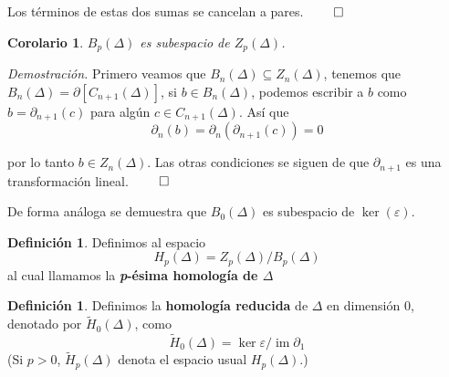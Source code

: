 \documentclass[12pt]{book}
\newtheorem{corollary}[theorem]{Corolario}
\theoremstyle{definition}
\newtheorem{definition}[theorem]{Definición}
\DeclareMathOperator{\im}{im}
\newcounter{in}
\newcounter{ini}
\begin{document}
Los términos de estas dos sumas se cancelan a pares. $\qed$

\begin{corollary}
  $B_{p}(\Delta)$ es subespacio de $Z_{p}(\Delta)$.
\end{corollary}

\textit{Demostración.} Primero veamos que $B_{n}(\Delta)\subseteq Z_{n}(\Delta)$, tenemos que
$B_{n}(\Delta)=\partial[C_{n+1}(\Delta)]$, si $b\in B_{n}(\Delta)$,
podemos escribir a $b$ como $b=\partial_{n+1}(c)$ para algún $c\in
C_{n+1}(\Delta)$. Así que
$$\partial_{n}(b)=\partial_{n}(\partial_{n+1}(c))=0$$

por lo tanto $b\in Z_{n}(\Delta)$.
Las otras condiciones se siguen de que $\partial_{n+1}$ es una
transformación lineal. $\qed$

De forma análoga se demuestra que $B_{0}(\Delta)$ es subespacio de $\ker(\varepsilon)$.
\begin{definition}
   Definimos al espacio
   $$H_{p}(\Delta)=Z_{p}(\Delta)/B_{p}(\Delta)$$
   al cual llamamos la \textbf{\emph{p}-ésima homología de $\Delta$}
\end{definition}

\begin{definition}
  Definimos la \textbf{homología reducida} de $\Delta$ en
  dimensión $0$, denotado por $\widetilde H_{0}(\Delta)$, como
  \begin{equation*}
    \widetilde H_{0}(\Delta)=\ker\varepsilon/\im \partial_{1}
  \end{equation*}
  (Si $p>0$, $\widetilde H_{p}(\Delta)$ denota el espacio usual
  $H_{p}(\Delta)$.)
\end{definition}
\end{document}
